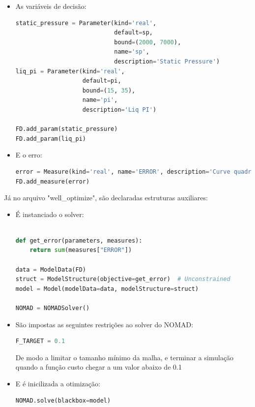 \begin{itemize}
\item As variáveis de decisão:
\begin{lstlisting}[language=Python]
static_pressure = Parameter(kind='real', 
                            default=sp, 
                            bound=(2000, 7000),
                            name='sp', 
                            description='Static Pressure')
liq_pi = Parameter(kind='real', 
                   default=pi, 
                   bound=(15, 35),
                   name='pi', 
                   description='Liq PI')

FD.add_param(static_pressure)
FD.add_param(liq_pi)
\end{lstlisting}
\end{itemize}

\begin{itemize}
\item E o erro:
\begin{lstlisting}[language=Python]
error = Measure(kind='real', name='ERROR', description='Curve quadratic error')
FD.add_measure(error)
\end{lstlisting}
\end{itemize}

Já no arquivo "well\_optimize", são declaradas estruturas auxiliares:
\begin{itemize}

\item É instanciado o solver:
\begin{lstlisting}[language=Python]%

def get_error(parameters, measures):
    return sum(measures["ERROR"])

data = ModelData(FD)
struct = ModelStructure(objective=get_error)  # Unconstrained
model = Model(modelData=data, modelStructure=struct)

NOMAD = NOMADSolver()

\end{lstlisting}



\item São impostas as seguintes restrições ao solver do NOMAD:
\begin{lstlisting}[language=Python]
F_TARGET = 0.1
\end{lstlisting}

De modo a limitar o tamanho mínimo da malha, e terminar a simulação quando a função custo chegar a um valor abaixo de 0.1

\item E é inicilizada a otimização:
\begin{lstlisting}[language=Python]
NOMAD.solve(blackbox=model)
\end{lstlisting}

\end{itemize}

